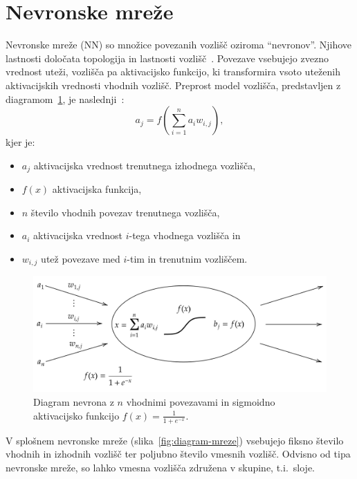 \documentclass[a4paper,12pt,openright]{book}
\begin{document}
    \section{Nevronske mreže}\label{sec:nevronske-mreze}
    Nevronske mreže (NN) so množice povezanih vozlišč oziroma \enquote{nevronov}.
    Njihove lastnosti določata topologija in lastnosti vozlišč~\cite{russell_norvig_2016}.
    Povezave vsebujejo zvezno vrednost uteži, vozlišča pa aktivacijsko funkcijo, ki transformira vsoto uteženih
    aktivacijskih vrednosti vhodnih vozlišč.
    Preprost model vozlišča, predstavljen z diagramom~\ref{fig:diagram-nevrona}, je naslednji~\cite{russell_norvig_2016}:
    \begin{equation}
        a_j=f(\sum_{i=1}^{n} a_i w_{i,j}),
        \label{eq:neuron_model_splosno}
    \end{equation}
    kjer je:
    \begin{itemize}
        \item $a_j$ aktivacijska vrednost trenutnega izhodnega vozlišča,
        \item $f(x)$ aktivacijska funkcija,
        \item $n$ število vhodnih povezav trenutnega vozlišča,
        \item $a_i$ aktivacijska vrednost $i$-tega vhodnega vozlišča in
        \item $w_{i,j}$ utež povezave med $i$-tim in trenutnim vozliščem.
    \end{itemize}

    \begin{figure}[H]
        \begin{center}
            \includegraphics[width=12cm]{diagram-nevron}
        \end{center}
        \caption{Diagram nevrona z $n$ vhodnimi povezavami in sigmoidno aktivacijsko funkcijo $f(x) =\frac{1}{1+e^{-x}}$.}
        \label{fig:diagram-nevrona}
    \end{figure}

    V splošnem nevronske mreže (slika~\ref{fig:diagram-mreze}) vsebujejo fiksno število vhodnih in izhodnih vozlišč ter poljubno število vmesnih vozlišč.
    Odvisno od tipa nevronske mreže, so lahko vmesna vozlišča združena v skupine, t.i.\ sloje.
\end{document}
